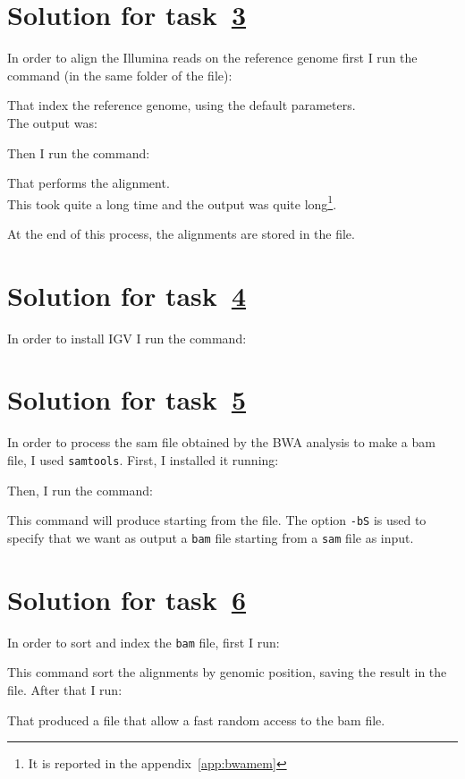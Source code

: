 \section{Solution for task~\hyperref[itm:1.3]{3}}
In order to align the Illumina reads on the reference genome first I run the
command (in the same folder of the 
file):

That index the reference genome, using the default parameters.\\
The output was:

Then I run the command:

That performs the alignment.\\
This took quite a long time and the output was quite long\footnote{It is
reported in the appendix~\ref{app:bwamem}}.

At the end of this process, the alignments are stored in the 
file.

\section{Solution for task~\hyperref[itm:1.4]{4}}
In order to install IGV I run the command:


\section{Solution for task~\hyperref[itm:1.5]{5}}
In order to process the sam file obtained by the BWA analysis to make a bam
file, I used \texttt{samtools}. First, I installed it running:

Then, I run the command:

This command will produce  starting from the 
file. The option \texttt{-bS} is used to specify that we want as output a 
\texttt{bam} file starting from a \texttt{sam} file as input.

\section{Solution for task~\hyperref[itm:1.6]{6}}
In order to sort and index the \texttt{bam} file, first I run:

This command sort the alignments by genomic position, saving the result in the\\
 file. After that I run:

That produced a  file that allow a fast random
access to the bam file.

